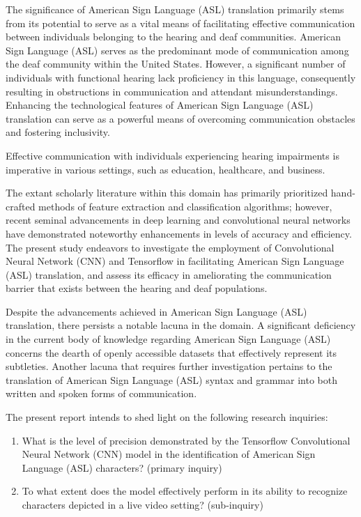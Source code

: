\documentclass[conference]{IEEEtran}
\begin{document}
The significance of American Sign Language (ASL) translation primarily stems from its potential to serve as a vital means of facilitating effective communication between individuals belonging to the hearing and deaf communities. American Sign Language (ASL) serves as the predominant mode of communication among the deaf community within the United States. However, a significant number of individuals with functional hearing lack proficiency in this language, consequently resulting in obstructions in communication and attendant misunderstandings. Enhancing the technological features of American Sign Language (ASL) translation can serve as a powerful means of overcoming communication obstacles and fostering inclusivity.

Effective communication with individuals experiencing hearing impairments is imperative in various settings, such as education, healthcare, and business.

The extant scholarly literature within this domain has primarily prioritized hand-crafted methods of feature extraction and classification algorithms; however, recent seminal advancements in deep learning and convolutional neural networks have demonstrated noteworthy enhancements in levels of accuracy and efficiency. The present study endeavors to investigate the employment of Convolutional Neural Network (CNN) and Tensorflow in facilitating American Sign Language (ASL) translation, and assess its efficacy in ameliorating the communication barrier that exists between the hearing and deaf populations.

Despite the advancements achieved in American Sign Language (ASL) translation, there persists a notable lacuna in the domain. A significant deficiency in the current body of knowledge regarding American Sign Language (ASL) concerns the dearth of openly accessible datasets that effectively represent its subtleties. Another lacuna that requires further investigation pertains to the translation of American Sign Language (ASL) syntax and grammar into both written and spoken forms of communication.

The present report intends to shed light on the following research inquiries:

\begin{enumerate}
    \item What is the level of precision demonstrated by the Tensorflow Convolutional Neural Network (CNN) model in the identification of American Sign Language (ASL) characters? (primary inquiry)
    \item To what extent does the model effectively perform in its ability to recognize characters depicted in a live video setting? (sub-inquiry)
\end{enumerate}
\end{document}
